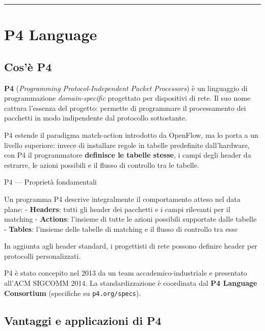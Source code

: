 \documentclass[
  italian,
  openany]{book}
\begin{document}
\begin{center}\rule{0.5\linewidth}{0.5pt}\end{center}

\section{P4 Language}\label{p4-language}

\subsection{Cos'è P4}\label{cosuxe8-p4}

\textbf{P4} (\emph{Programming Protocol-Independent Packet Processors})
è un linguaggio di programmazione \emph{domain-specific} progettato per
dispositivi di rete. Il suo nome cattura l'essenza del progetto:
permette di programmare il processamento dei pacchetti in modo
indipendente dal protocollo sottostante.

P4 estende il paradigma match-action introdotto da OpenFlow, ma lo porta
a un livello superiore: invece di installare regole in tabelle
predefinite dall'hardware, con P4 il programmatore \textbf{definisce le
tabelle stesse}, i campi degli header da estrarre, le azioni possibili e
il flusso di controllo tra le tabelle.

\begin{calloutdefinition}{P4 — Proprietà fondamentali}

Un programma P4 descrive integralmente il comportamento atteso nel data
plane: - \textbf{Headers}: tutti gli header dei pacchetti e i campi
rilevanti per il matching - \textbf{Actions}: l'insieme di tutte le
azioni possibili supportate dalle tabelle - \textbf{Tables}: l'insieme
delle tabelle di matching e il flusso di controllo tra esse

In aggiunta agli header standard, i progettisti di rete possono definire
header per protocolli personalizzati.

\end{calloutdefinition}

P4 è stato concepito nel 2013 da un team accademico-industriale e
presentato all'ACM SIGCOMM 2014. La standardizzazione è coordinata dal
\textbf{P4 Language Consortium} (specifiche su \texttt{p4.org/specs}).

\subsection{Vantaggi e applicazioni di
P4}\label{vantaggi-e-applicazioni-di-p4}
\end{document}
